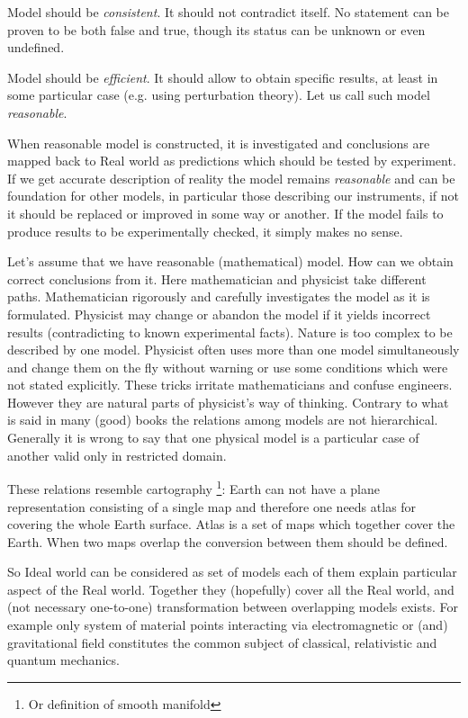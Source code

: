 Model should be {\em consistent}. It should  not contradict itself. No statement can be proven to
be both false and true, though its status can be unknown or even undefined.

Model should be {\em efficient}. It should allow to obtain  specific results,
at least in some particular case (e.g. using perturbation theory). 
Let us call such model {\em reasonable}.

 When reasonable model is constructed, 
it is investigated and conclusions are mapped back to Real world as predictions which 
should be tested by  experiment. 
If we get  accurate description of reality the model remains {\em reasonable} and can be foundation 
for other models, in particular those describing our instruments, if not it  should be replaced or improved in some way or another.
If the model fails to produce results to be experimentally checked, it simply makes no sense.

Let's assume that we have reasonable (mathematical) model. How can
we obtain correct conclusions from it. Here mathematician
and physicist take different paths. Mathematician rigorously
and carefully investigates the model as it is formulated.
Physicist may change or abandon the model if it yields 
 incorrect results (contradicting to known experimental facts).
Nature is too complex to be described by one model.
Physicist often uses more than one model simultaneously and change them on the fly 
without warning or use some conditions which were not stated explicitly. 
These tricks irritate mathematicians and confuse engineers. However they are natural parts of 
physicist's way of thinking. Contrary to what is said in many (good) books the relations 
among models are not hierarchical. Generally it is wrong to say that one physical model is a particular
case of another valid only in restricted domain. 

 These relations resemble cartography \footnote{Or definition of smooth manifold}: 
Earth can not have a plane representation consisting of a single map and 
therefore one needs atlas for covering the whole Earth surface. 
Atlas is a set of maps which together cover the Earth. 
When two maps overlap the  conversion between them should be defined.

So Ideal world can be considered as set of models each of them explain particular aspect
of the Real world. Together they (hopefully) cover all the Real world,  and  (not necessary one-to-one)
 transformation between overlapping models exists.
For example only system of material points interacting via electromagnetic or (and) gravitational
field constitutes the common subject of classical, relativistic and quantum mechanics.


